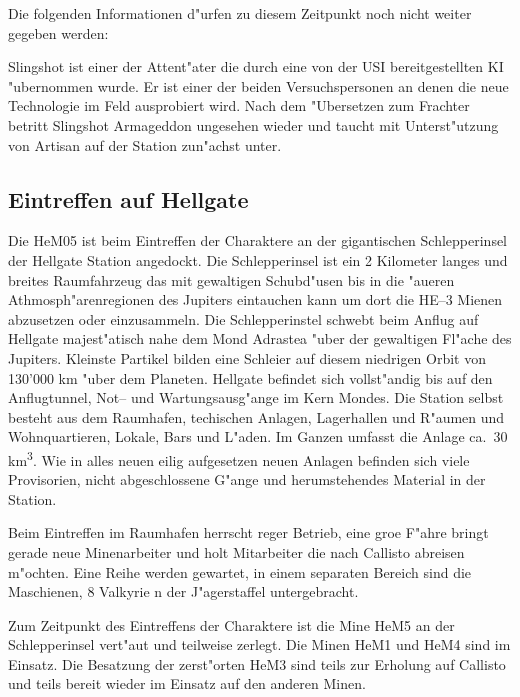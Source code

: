 \begin{remarks}
	Die folgenden Informationen d"urfen zu diesem Zeitpunkt noch nicht weiter gegeben werden:
	
	Slingshot ist einer der Attent"ater die durch eine von der USI bereitgestellten KI "ubernommen wurde. Er ist einer der beiden Versuchspersonen an denen die neue Technologie im Feld ausprobiert wird. Nach dem "Ubersetzen zum Frachter betritt Slingshot Armageddon ungesehen wieder und taucht mit Unterst"utzung von Artisan auf der Station zun"achst unter.
\end{remarks}

\subsection{Eintreffen auf Hellgate}

Die HeM05 ist beim Eintreffen der Charaktere an der gigantischen Schlepperinsel der Hellgate Station angedockt. Die Schlepperinsel ist ein 2 Kilometer langes und breites Raumfahrzeug das mit gewaltigen Schubd"usen bis in die "au\3eren Athmosph"arenregionen des Jupiters eintauchen kann um dort die HE--3 Mienen abzusetzen oder einzusammeln. Die Schlepperinstel schwebt beim Anflug auf Hellgate majest"atisch nahe dem Mond Adrastea "uber der gewaltigen Fl"ache des Jupiters. Kleinste Partikel bilden eine Schleier auf diesem niedrigen Orbit von 130'000 km "uber dem Planeten. Hellgate befindet sich vollst"andig bis auf den Anflugtunnel, Not-- und Wartungsausg"ange im Kern  Mondes. Die Station selbst besteht aus dem Raumhafen, techischen Anlagen, Lagerhallen und R"aumen und Wohnquartieren, Lokale, Bars und L"aden. Im Ganzen umfasst die Anlage ca.~30 km\textsuperscript{3}. Wie in alles neuen eilig aufgesetzen neuen Anlagen befinden sich viele Provisorien, nicht abgeschlossene G"ange und herumstehendes Material in der Station.

Beim Eintreffen im Raumhafen herrscht reger Betrieb, eine gro\3e F"ahre bringt gerade neue Minenarbeiter und holt Mitarbeiter die nach Callisto abreisen m"ochten. Eine Reihe werden gewartet, in einem separaten Bereich sind die Maschienen, 8 Valkyrie n der J"agerstaffel untergebracht. 

Zum Zeitpunkt des Eintreffens der Charaktere ist die Mine HeM5 an der Schlepperinsel vert"aut und teilweise zerlegt. Die Minen HeM1 und HeM4 sind im Einsatz. Die Besatzung der zerst"orten HeM3 sind teils zur Erholung auf Callisto und teils bereit wieder im Einsatz auf den anderen Minen.

